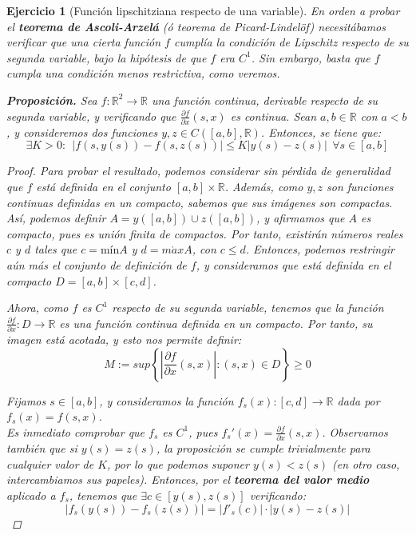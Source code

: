 \documentclass[11pt, a4paper, titlepage]{article}
\newcommand{\pder}[2][]{\frac{\partial#1}{\partial#2}}
\theoremstyle{exercise-style}
\newtheorem*{ejer}{Ejercicio}
\theoremstyle{theorem-style}
\begin{document}
\begin{ejer}[Función lipschitziana respecto de una variable] \hfill

En orden a probar el \textbf{teorema de Ascoli-Arzelá} (ó \textit{teorema de Picard-Lindelöf}) necesitábamos verificar que una cierta función $f$ cumplía la condición de Lipschitz respecto de su segunda variable, bajo la hipótesis de que $f$ era $C^1$. Sin embargo, basta que $f$ cumpla una condición menos restrictiva, como veremos.

\textbf{Proposición.} Sea $f:\mathbb{R}^2 \longrightarrow \mathbb{R}$ una función continua, derivable respecto de su segunda variable, y verificando que $\pder[f]{x}(s,x)$ es continua. Sean $a,b \in \mathbb{R}$ con $a < b$, y consideremos dos funciones $y,z \in C([a,b],\mathbb{R})$. Entonces, se tiene que: $$\exists K > 0 : \ \ |f(s,y(s)) - f(s,z(s)) | \le K|y(s)-z(s)| \ \ \forall s \in [a,b]$$

\begin{proof} \hfill

Para probar el resultado, podemos considerar sin pérdida de generalidad que $f$ está definida en el conjunto $[a,b] \times \mathbb{R}$. Además, como $y,z$ son funciones continuas definidas en un compacto, sabemos que sus imágenes son compactas. Así, podemos definir $A = y([a,b]) \cup z([a,b])$, y afirmamos que $A$ es compacto, pues es unión finita de compactos. Por tanto, existirán números reales $c$ y $d$ tales que $c = \text{mín} A$ y $d = m\acute{a}x A$, con $c \le d$. Entonces, podemos restringir aún más el conjunto de definición de $f$, y consideramos que está definida en el compacto $D = [a,b]\times [c,d]$.

Ahora, como $f$ es $C^1$ respecto de su segunda variable, tenemos que la función $\displaystyle\pder[f]{x}: D \longrightarrow \mathbb{R}$ es una función continua definida en un compacto. Por tanto, su imagen está acotada, y esto nos permite definir: $$M := sup \left\{ \left| \pder[f]{x}(s,x) \right|\colon (s,x) \in D\right\} \ge 0$$

Fijamos $s \in [a,b]$, y consideramos la función $f_s(x):[c,d] \longrightarrow \mathbb{R}$ dada por $f_s(x) = f(s,x)$.\\ Es inmediato comprobar que $f_s$ es $C^1$, pues $f_s'(x) = \pder[f]{x}(s,x)$. Observamos también que si $y(s)=z(s)$, la proposición se cumple trivialmente para cualquier valor de $K$, por lo que podemos suponer $y(s) < z(s)$ (en otro caso, intercambiamos sus papeles). Entonces, por el \textbf{teorema del valor medio} aplicado a $f_s$, tenemos que $\exists c \in [y(s), z(s)]$ verificando: $$|f_s(y(s)) - f_s(z(s))| = |f'_s(c)|\cdot|y(s)-z(s)|$$


\end{proof}
\end{ejer}
\end{document}
